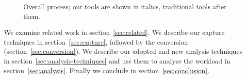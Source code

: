 \begin{figure}
\center {}
\caption{Overall process; our tools are shown in italics, traditional tools
after them.}
\label{fig:overall-process}
\end{figure}

We examine related work in section~\ref{sec:related}.  We describe our
capture techniques in section~\ref{sec:capture}, followed by the
conversion (section~\ref{sec:conversion}). We describe our adopted and
new analysis techniques in section~\ref{sec:analysis-techniques} and
use them to analyze the workload in section~\ref{sec:analysis}.
Finally we conclude in section~\ref{sec:conclusion}.

